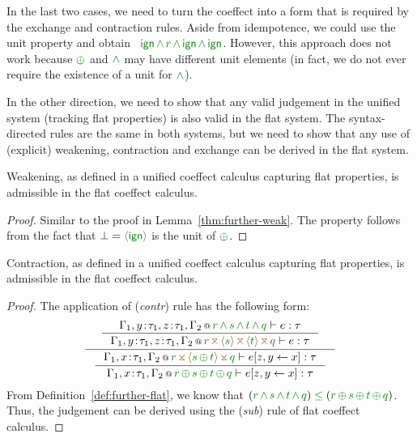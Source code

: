 \noindent
In the last two cases, we need to turn the coeffect into a form that is required by the exchange
and contraction rules. Aside from idempotence, we could use the unit property and obtain
\eg~$\czero\,\czip\,\cclrd{r}\,\czip\,\czero\,\czip\,\czero$. However, this approach does not
work because $\cpar$ and $\czip$ may have different unit elements (in fact, we do not ever require
the existence of a unit for $\czip$).

In the other direction, we need to show that any valid judgement in the unified system (tracking
flat properties) is also valid in the flat system. The syntax-directed rules are the same in both
systems, but we need to show that any use of (explicit) weakening, contraction and exchange can be
derived in the flat system.

\begin{lemma}
Weakening, as defined in a unified coeffect calculus capturing flat properties, is admissible in
the flat coeffect calculus.
\end{lemma}
\begin{proof}
Similar to the proof in Lemma~\ref{thm:further-weak}. The property follows from the fact that
$\bot=\alift{\czero}$ is the unit of $\cpar$.
\end{proof}

\begin{lemma}
\label{thm:further-rev-contr}
Contraction, as defined in a unified coeffect calculus capturing flat properties, is admissible in
the flat coeffect calculus.
\end{lemma}
\begin{proof}
The application of (\emph{contr}) rule has the following form:
\begin{equation*}
\inference
 { \inference
    {\coctx{\Gamma_1,y\!:\!\tau_1,z\!:\!\tau_1,\Gamma_2}{\cclrd{r} \,\czip\, \cclrd{s} \,\czip\, \cclrd{t} \,\czip\, \cclrd{q}} \vdash e : \tau}
    {\coctx{\Gamma_1,y\!:\!\tau_1,z\!:\!\tau_1,\Gamma_2}{\cclrd{r} \,\azip\, \alift{\cclrd{s}} \,\azip\, \alift{\cclrd{t}} \,\azip\, \cclrd{q}} \vdash e : \tau} }
 { \inference
    {\coctx{\Gamma_1,x\!:\!\tau_1,\Gamma_2}{\cclrd{r} \,\apar\, \alift{\cclrd{s} \,\cpar\, \cclrd{t}} \,\apar\, \cclrd{q}} \vdash \subst{e}{z,y}{x} : \tau}
    {\coctx{\Gamma_1,x\!:\!\tau_1,\Gamma_2}{\cclrd{r} \,\cpar\, \cclrd{s} \,\cpar\, \cclrd{t} \,\cpar\, \cclrd{q}} \vdash \subst{e}{z,y}{x} : \tau} }
\end{equation*}
%
From Definition~\ref{def:further-flat}, we know that $(\cclrd{r} \,\czip\, \cclrd{s} \,\czip\, \cclrd{t} \,\czip\, \cclrd{q})
\;\cleq\; (\cclrd{r} \,\cpar\, \cclrd{s} \,\cpar\, \cclrd{t} \,\cpar\, \cclrd{q})$. Thus, the judgement
 can be derived using the (\emph{sub}) rule of flat coeffect calculus.
\end{proof}


